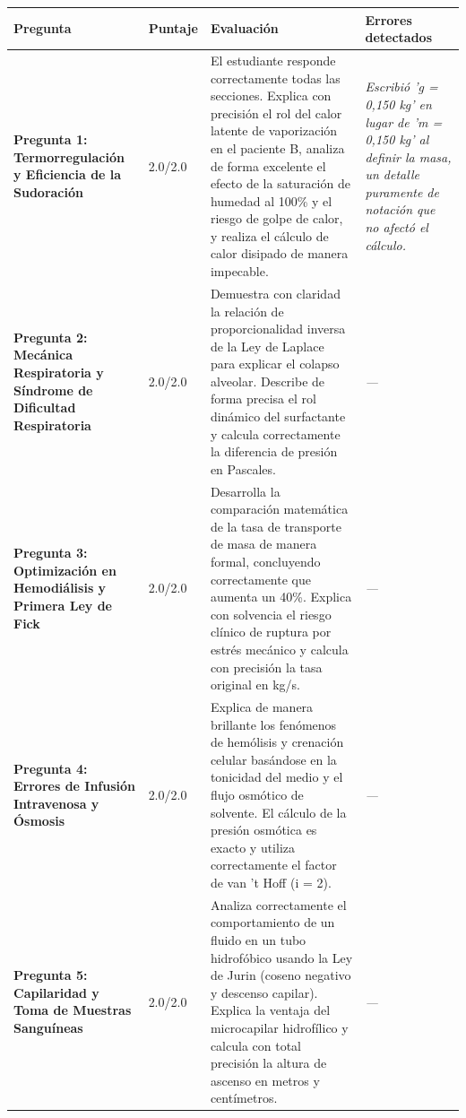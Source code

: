 \documentclass[11pt,a4paper]{article}
\begin{document}
\begin{longtable}{>{\bfseries}p{2.8cm} p{1.6cm} p{7.0cm} p{2.8cm}}
  \toprule
  \textbf{Pregunta} & \textbf{Puntaje} & \textbf{Evaluación} & \textbf{Errores detectados} \\
  \midrule
  \endhead
  \bottomrule
  \endfoot
    \textbf{Pregunta 1: Termorregulación y Eficiencia de la Sudoración} & 2.0/2.0 & El estudiante responde correctamente todas las secciones. Explica con precisión el rol del calor latente de vaporización en el paciente B, analiza de forma excelente el efecto de la saturación de humedad al 100\% y el riesgo de golpe de calor, y realiza el cálculo de calor disipado de manera impecable. & \textit{Escribió 'g = 0,150 kg' en lugar de 'm = 0,150 kg' al definir la masa, un detalle puramente de notación que no afectó el cálculo.} \\
    \midrule
    \textbf{Pregunta 2: Mecánica Respiratoria y Síndrome de Dificultad Respiratoria} & 2.0/2.0 & Demuestra con claridad la relación de proporcionalidad inversa de la Ley de Laplace para explicar el colapso alveolar. Describe de forma precisa el rol dinámico del surfactante y calcula correctamente la diferencia de presión en Pascales. & \textit{---} \\
    \midrule
    \textbf{Pregunta 3: Optimización en Hemodiálisis y Primera Ley de Fick} & 2.0/2.0 & Desarrolla la comparación matemática de la tasa de transporte de masa de manera formal, concluyendo correctamente que aumenta un 40\%. Explica con solvencia el riesgo clínico de ruptura por estrés mecánico y calcula con precisión la tasa original en kg/s. & \textit{---} \\
    \midrule
    \textbf{Pregunta 4: Errores de Infusión Intravenosa y Ósmosis} & 2.0/2.0 & Explica de manera brillante los fenómenos de hemólisis y crenación celular basándose en la tonicidad del medio y el flujo osmótico de solvente. El cálculo de la presión osmótica es exacto y utiliza correctamente el factor de van 't Hoff (i = 2). & \textit{---} \\
    \midrule
    \textbf{Pregunta 5: Capilaridad y Toma de Muestras Sanguíneas} & 2.0/2.0 & Analiza correctamente el comportamiento de un fluido en un tubo hidrofóbico usando la Ley de Jurin (coseno negativo y descenso capilar). Explica la ventaja del microcapilar hidrofílico y calcula con total precisión la altura de ascenso en metros y centímetros. & \textit{---} \\
    \midrule
\end{longtable}
\end{document}

